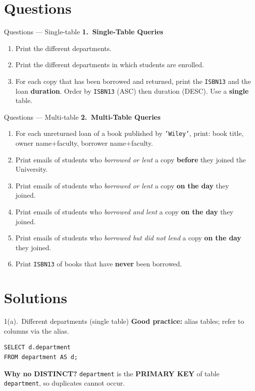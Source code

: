 \documentclass{beamer}
\begin{document}
\section{Questions}
\begin{frame}{Questions — Single-table}
\footnotesize
\textbf{1.\ Single-Table Queries}
\begin{enumerate}\itemsep2pt
  \item[(a)] Print the different departments.
  \item[(b)] Print the different departments in which students are enrolled.
  \item[(c)] For each copy that has been borrowed and returned, print the \texttt{ISBN13} and the loan \textbf{duration}. Order by \texttt{ISBN13} (ASC) then duration (DESC). Use a \textbf{single} table.
\end{enumerate}
\end{frame}

\begin{frame}{Questions — Multi-table}
\footnotesize
\textbf{2.\ Multi-Table Queries}
\begin{enumerate}\itemsep2pt
  \item[(a)] For each unreturned loan of a book published by \texttt{'Wiley'}, print: book title, owner name+faculty, borrower name+faculty.
  \item[(b)] Print emails of students who \emph{borrowed or lent} a copy \textbf{before} they joined the University.
  \item[(c)] Print emails of students who \emph{borrowed or lent} a copy \textbf{on the day} they joined.
  \item[(d)] Print emails of students who \emph{borrowed and lent} a copy \textbf{on the day} they joined.
  \item[(e)] Print emails of students who \emph{borrowed but did not lend} a copy \textbf{on the day} they joined.
  \item[(f)] Print \texttt{ISBN13} of books that have \textbf{never} been borrowed.
\end{enumerate}
\end{frame}
\section{Solutions}

\begin{frame}[fragile]{1(a).\ Different departments (single table)}
\small
\textbf{Good practice:} alias tables; refer to columns via the alias.
\begin{lstlisting}
SELECT d.department
FROM department AS d;
\end{lstlisting}
\textbf{Why no DISTINCT?} \texttt{department} is the \textbf{PRIMARY KEY} of table \texttt{department}, so duplicates cannot occur.
\end{frame}
\end{document}
